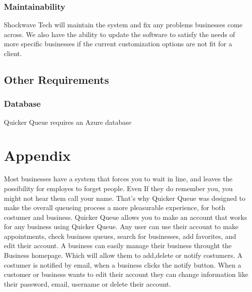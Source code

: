 \documentclass{scrreprt}
\begin{document}
\subsection{Maintainability}
Shockwave Tech will maintain the system and fix any problems businesses come across. We also have the ability to update the software to satisfy the needs of more specific businesses if the current customization options are not fit for a client.

\section{Other Requirements}

\subsection{Database}
Quicker Queue requires an Azure database

\chapter{Appendix}
\doublespacing
Most businesses have a system that forces you to wait in line, and leaves the possibility for employes to forget people. 
Even If they do remember you, you might not hear them call your name. 
That's why Quicker Queue was designed to make the overall queueing process a more pleasurable experience, for both costumer and business. 
Quicker Queue allows you to make an account that works for any business using Quicker Queue. Any user can use their account to make appointments, check business queues, search for businesses, add favorites, and edit their account.
A business can easily manage their business throught the Business homepage. Which will allow them to add,delete or notify costumers.
A costumer is notified by email, when a business clicks the notify button. When a customer or business wants to edit their account they can change information like their password, email, username or delete their account.
\end{document}
